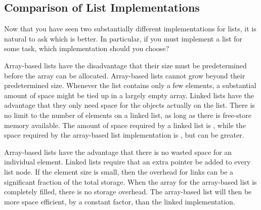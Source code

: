 \subsection{Comparison of List Implementations}
\label{CompareLists}

Now that you have seen two substantially different implementations for
lists, it is natural to ask which is better.
In particular, if you must implement a list for some task,
which implementation should you choose?

Array-based lists have the disadvantage that their size must be
predetermined before the array can be allocated.
Array-based lists cannot grow beyond their predetermined size.
Whenever the list contains only a few elements, a
substantial amount of space might be tied up in a largely empty array.
Linked lists have the advantage that they only need space for the
objects actually on the list.
There is no limit to the number of elements on a linked list,
as long as there is free-store memory available.
The amount of space required by a linked list is \Thetan, while the
space required by the array-based list implementation is \Omegan, but
can be greater.

Array-based lists have the advantage that there is no wasted
space for an individual element.
Linked lists require that an extra pointer be added to every list
node.
If the element size is small, then the overhead for
links can be a significant fraction of the total storage.
When the array for the array-based list is completely filled, there
is no storage overhead.
The array-based list will then be more space efficient, by a
constant factor, than the linked implementation.

